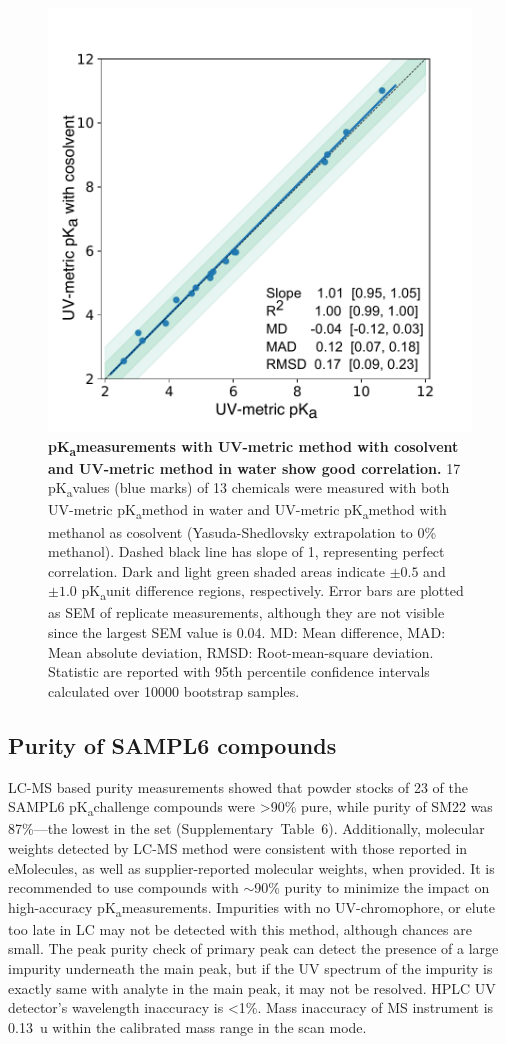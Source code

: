 \documentclass[9pt,lineno]{elife}
\newcommand{\pKa}{pK\textsubscript{a}}
\begin{document}
\begin{figure}
\begin{center}
\includegraphics[width=0.5\linewidth]{figures/water_vs_cosolvent_pKa_values_correlation_plot.pdf}
\caption{{\bf \pKa measurements with UV-metric method with cosolvent and UV-metric method in water show good correlation.} 
17 \pKa values (blue marks) of 13 chemicals were measured with both UV-metric \pKa method in water and UV-metric \pKa method with methanol as cosolvent (Yasuda-Shedlovsky extrapolation to 0\% methanol). Dashed black line has slope of 1, representing perfect correlation.  Dark and light green shaded areas indicate $\pm 0.5$ and $\pm 1.0$ \pKa unit difference regions, respectively. Error bars are plotted as SEM of replicate measurements, although they are not visible since the largest SEM value is 0.04. MD: Mean difference, MAD: Mean absolute deviation, RMSD: Root-mean-square deviation.  Statistic are reported with 95th percentile confidence intervals calculated over 10000 bootstrap samples.
}
\label{fig:water_vs_cosolvent_pKa_correlation}
\end{center}
\end{figure}

\subsection{Purity of SAMPL6 compounds}
LC-MS based purity measurements showed that powder stocks of 23 of the SAMPL6 \pKa challenge compounds were >90\% pure, while purity of SM22 was 87\%---the lowest in the set (Supplementary~Table~6).  
Additionally, molecular weights detected by LC-MS method were consistent with those reported in eMolecules, as well as supplier-reported molecular weights, when provided. 
 It is recommended to use compounds with $\sim$90\% purity to minimize the impact on high-accuracy \pKa measurements. 
Impurities with no UV-chromophore, or elute too late in LC may not be detected with this method, although chances are small. The peak purity check of primary peak can detect the presence of a large impurity underneath the main peak, but if the UV spectrum of the impurity is exactly same with analyte in the main peak, it may not be resolved. HPLC UV detector's wavelength inaccuracy is <1\%. Mass inaccuracy of MS instrument is 0.13~u within the calibrated mass range in the scan mode. 
\end{document}

